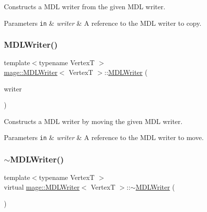 Constructs a M\+DL writer from the given M\+DL writer.


\begin{DoxyParams}[1]{Parameters}
\mbox{\tt in}  & {\em writer} & A reference to the M\+DL writer to copy. \\
\hline
\end{DoxyParams}
\hypertarget{classmage_1_1_m_d_l_writer_a21512d36a1e88eefa5f77fa7ee74753c}{}\label{classmage_1_1_m_d_l_writer_a21512d36a1e88eefa5f77fa7ee74753c} 
\subsubsection{\texorpdfstring{M\+D\+L\+Writer()}{MDLWriter()}\hspace{0.1cm}{\footnotesize\ttfamily [3/3]}}
{\footnotesize\ttfamily template$<$typename VertexT $>$ \\
\hyperlink{classmage_1_1_m_d_l_writer}{mage\+::\+M\+D\+L\+Writer}$<$ VertexT $>$\+::\hyperlink{classmage_1_1_m_d_l_writer}{M\+D\+L\+Writer} (\begin{DoxyParamCaption}\item[{\hyperlink{classmage_1_1_m_d_l_writer}{M\+D\+L\+Writer}$<$ VertexT $>$ \&\&}]{writer }\end{DoxyParamCaption})}

Constructs a M\+DL writer by moving the given M\+DL writer.


\begin{DoxyParams}[1]{Parameters}
\mbox{\tt in}  & {\em writer} & A reference to the M\+DL writer to move. \\
\hline
\end{DoxyParams}
\hypertarget{classmage_1_1_m_d_l_writer_a8ec899d031d513eedf3345b78361d0de}{}\label{classmage_1_1_m_d_l_writer_a8ec899d031d513eedf3345b78361d0de} 
\subsubsection{\texorpdfstring{$\sim$\+M\+D\+L\+Writer()}{~MDLWriter()}}
{\footnotesize\ttfamily template$<$typename VertexT $>$ \\
virtual \hyperlink{classmage_1_1_m_d_l_writer}{mage\+::\+M\+D\+L\+Writer}$<$ VertexT $>$\+::$\sim$\hyperlink{classmage_1_1_m_d_l_writer}{M\+D\+L\+Writer} (\begin{DoxyParamCaption}{ }\end{DoxyParamCaption})\hspace{0.3cm}{\ttfamily [virtual]}}

